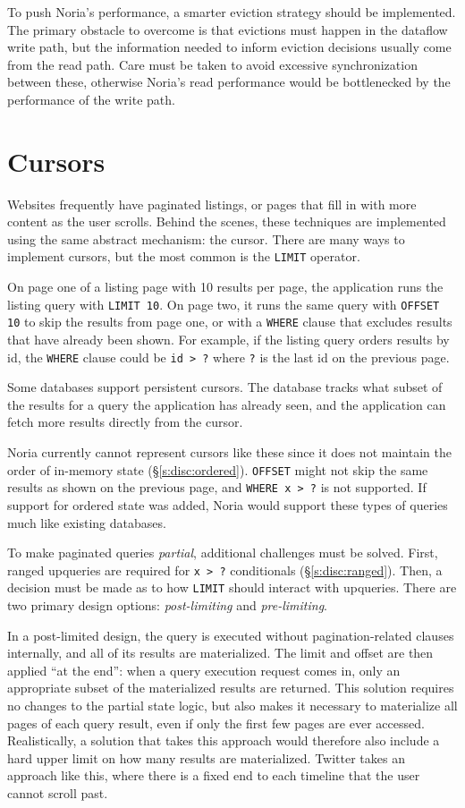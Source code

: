 To push Noria's performance, a smarter eviction strategy should be implemented.
The primary obstacle to overcome is that evictions must happen in the dataflow
write path, but the information needed to inform eviction decisions usually come
from the read path. Care must be taken to avoid excessive synchronization
between these, otherwise Noria's read performance would be bottlenecked by the
performance of the write path.

\section{Cursors}

Websites frequently have paginated listings, or pages that fill in with more
content as the user scrolls. Behind the scenes, these techniques are implemented
using the same abstract mechanism: the cursor. There are many ways to implement
cursors, but the most common is the \texttt{LIMIT} operator.

On page one of a listing page with 10 results per page, the application runs the
listing query with \texttt{LIMIT 10}. On page two, it runs the same query with
\texttt{OFFSET 10} to skip the results from page one, or with a \texttt{WHERE}
clause that excludes results that have already been shown. For example, if the
listing query orders results by id, the \texttt{WHERE} clause could be
\texttt{id > ?} where \texttt{?} is the last id on the previous page.

Some databases support persistent cursors. The database tracks what subset of
the results for a query the application has already seen, and the application
can fetch more results directly from the cursor.

Noria currently cannot represent cursors like these since it does not maintain
the order of in-memory state (\S\ref{s:disc:ordered}). \texttt{OFFSET} might not
skip the same results as shown on the previous page, and \texttt{WHERE x > ?} is
not supported. If support for ordered state was added, Noria would support these
types of queries much like existing databases.

To make paginated queries \emph{partial}, additional challenges must be solved.
First, ranged upqueries are required for \texttt{x > ?} conditionals
(\S\ref{s:disc:ranged}). Then, a decision must be made as to how \texttt{LIMIT}
should interact with upqueries. There are two primary design options:
\emph{post-limiting} and \emph{pre-limiting}.

In a post-limited design, the query is executed without pagination-related
clauses internally, and all of its results are materialized. The limit and
offset are then applied ``at the end'': when a query execution request comes in,
only an appropriate subset of the materialized results are returned. This
solution requires no changes to the partial state logic, but also makes it
necessary to materialize all pages of each query result, even if only the first
few pages are ever accessed. Realistically, a solution that takes this approach
would therefore also include a hard upper limit on how many results are
materialized. Twitter takes an approach like this, where there is a fixed end to
each timeline that the user cannot scroll past.

